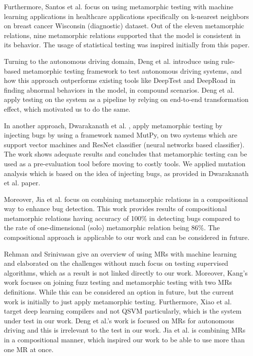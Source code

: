 \documentclass[12pt,a4paper]{article}
\begin{document}
	Furthermore, Santos et al. \cite{ssantos2020} focus on using metamorphic testing with machine learning applications in healthcare applications specifically on k-nearest neighbors on breast cancer Wisconsin (diagnostic) dataset. Out of the eleven metamorphic relations, nine metamorphic relations supported that the model is consistent in its behavior. The usage of statistical testing was inspired initially from this paper.
	
	Turning to the autonomous driving domain, Deng et al. \cite{ydeng2023} introduce using rule-based metamorphic testing framework to test autonomous driving systems, and how this approach outperforms existing tools like DeepTest and DeepRoad in finding abnormal behaviors in the model, in compound scenarios.	 Deng et al. \cite{ydeng2023} apply testing on the system as a pipeline by relying on end-to-end transformation effect, which motivated us to do the same.
	
	In another approach, Dwarakanath et al. \cite{Dwarakanath2018}, apply metamorphic testing by injecting bugs by using a framework named MutPy, on two systems which are support vector machines and ResNet classifier (neural networks based classifier). The work shows adequate results and concludes that metamorphic testing can be used as a pre-evaluation tool before moving to costly tools. We applied mutation analysis which is based on the idea of injecting bugs, as provided in  Dwarakanath et al. \cite{Dwarakanath2018} paper.
	
	Moreover, Jia et al. \cite{mjia2020} focus on combining metamorphic relations in a compositional way to enhance bug detection. This work provides results of compositional metamorphic relations having accuracy of 100\% in detecting bugs compared to the rate of one-dimensional (solo) metamorphic relation being 86\%. The compositional approach is applicable to our work and can be considered in future.
	
	Rehman and Srinivasan \cite{frehman2023} give an overview of using MRs with machine learning and elaborated on the challenges without much focus on testing supervised algorithms, which as a result is not linked directly to our work. Moreover, Kang's work \cite{dkang2022} focuses on joining fuzz testing and metamorphic testing with two MRs definitions. While this can be considered an option in future, but the current work is initially to just apply metamorphic testing. Furthermore, Xiao et al. \cite{dciao2022} target deep learning compilers and not QSVM particularly, which is the system under test in our work. Deng et al.'s \cite{ydeng2023} work is focused on MRs for autonomous driving and this is irrelevant to the test in our work. Jia et al. \cite{mjia2020} is combining MRs in a compositional manner, which inspired our work to be able to use more than one MR at once.
	
\end{document}
